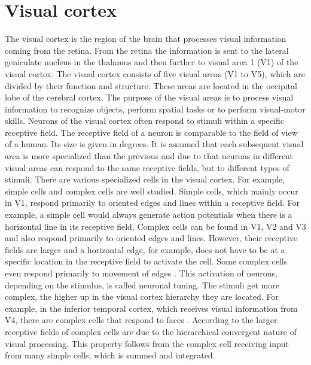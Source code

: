 \section{Visual cortex}

The visual cortex is the region of the brain that processes visual information coming from the retina. From the retina the information is sent to the lateral geniculate nucleus in the thalamus and then further to  visual area 1 (V1) of the visual cortex. The visual cortex consists of five visual areas (V1 to V5), which are divided by their function and structure. These areas are located in the occipital lobe of the cerebral cortex. The purpose of the visual areas is to process visual information to recognize objects, perform spatial tasks or to perform  visual-motor skills. Neurons of the visual cortex often respond to stimuli within a specific receptive field. The receptive field of a neuron is comparable to the field of view of a human. Its size is given in degrees. It is assumed that each subsequent visual area is more specialized than the previous and due to that neurons in different visual areas can respond to the same receptive fields, but to different types of stimuli. There are various specialized cells in the visual cortex. For example, simple cells and complex cells are well studied. Simple cells, which mainly occur in V1, respond primarily to oriented edges and lines within a receptive field. For example, a simple cell would always generate action potentials when there is a horizontal line in its receptive field. Complex cells can be found in V1, V2 and V3 and also respond primarily to oriented edges and lines. However, their receptive fields are larger and a horizontal edge, for example, does not have to be at a specific location in the receptive field to activate the cell. Some complex cells even respond primarily to movement of edges \citep{visualCortexBook}.
This activation of neurons, depending on the stimulus, is called neuronal tuning. The stimuli get more complex, the higher up in the visual cortex hierarchy they are located. For example, in the inferior temporal cortex, which receives visual information from V4, there are complex cells that respond to faces \citep{complexCellsFaces}.
According to \citet{complexCellsIntegrated} the larger receptive fields of complex cells are due to the hierarchical convergent nature of visual processing. This property follows from the complex cell receiving input from many simple cells, which is summed and integrated.

